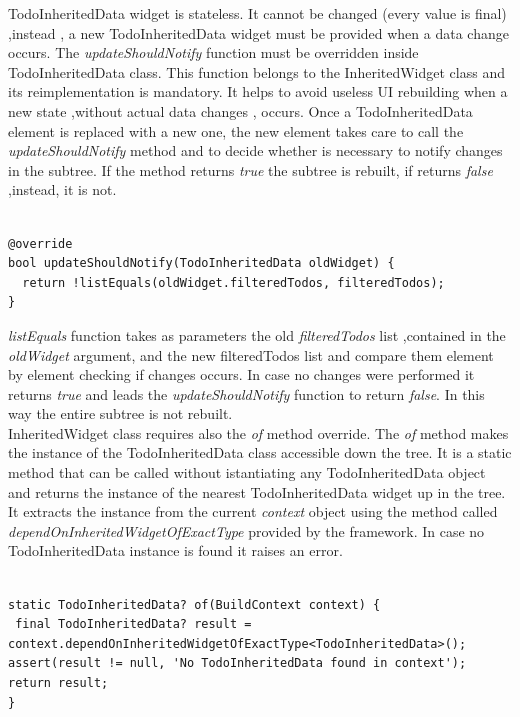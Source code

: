TodoInheritedData widget is stateless. It cannot be changed (every value is final) ,instead , a new TodoInheritedData widget must be provided when a data change occurs. 
The \textit{updateShouldNotify }function must be overridden inside TodoInheritedData class. This function belongs to the InheritedWidget class and its reimplementation is mandatory. It helps to avoid useless UI rebuilding when a new state ,without actual data changes , occurs. Once a TodoInheritedData element is replaced with a new one, the new element takes care to call the \textit{updateShouldNotify }method and to decide whether is necessary to notify changes in the subtree. If the method returns \textit{true }the subtree is rebuilt, if returns \textit{false} ,instead, it is not.
\mbox{}\\

 \mbox{}

\begin{verbatim}

@override
bool updateShouldNotify(TodoInheritedData oldWidget) {
  return !listEquals(oldWidget.filteredTodos, filteredTodos);
}
\end{verbatim}

\textit{listEquals }function takes as parameters the old \textit{filteredTodos} list ,contained in the \textit{oldWidget} argument, and the new filteredTodos list and compare them element by element checking if changes occurs. In case no changes were performed it returns \textit{true} and leads the \textit{updateShouldNotify }function to return \textit{false}. In this way the entire subtree is not rebuilt.\\
InheritedWidget class requires also the \textit{of} method override. The \textit{of }method makes the instance of the TodoInheritedData class accessible down the tree. It is a static method that can be called without istantiating any TodoInheritedData object and returns the instance of the nearest TodoInheritedData widget up in the tree. It extracts the instance from the current \textit{context} object using the method called \textit{dependOnInheritedWidgetOfExactType} provided by the framework. In case no TodoInheritedData instance is found it raises an error.


 \mbox{}
\begin{verbatim}

static TodoInheritedData? of(BuildContext context) {
 final TodoInheritedData? result = context.dependOnInheritedWidgetOfExactType<TodoInheritedData>(); 
assert(result != null, 'No TodoInheritedData found in context');
return result;
}
\end{verbatim}


